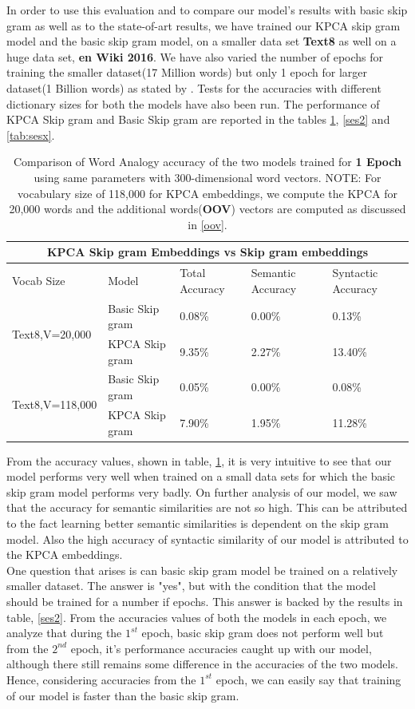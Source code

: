 In order to use this evaluation and to compare our model's results with basic skip gram as well as to the state-of-art results, we have trained our KPCA skip gram model and the basic skip gram model, on a smaller data set \textbf{Text8} as well on a huge data set, \textbf{en Wiki 2016}. We have also varied the number of epochs for training the smaller dataset(17 Million words) but only 1 epoch for larger dataset(1 Billion words) as stated by \cite{mikolov2013efficient}. Tests for the accuracies with different dictionary sizes for both the models have also been run.  
The performance of KPCA Skip gram and Basic Skip gram are reported in the tables \ref{ses1}, \ref{ses2} and \ref{tab:sesx}.  
\begin{table}[H]
	\hskip-1.0cm
	\begin{tabular}[htbp]{|l|l|l|l|l|}	
		\hline		
		\multicolumn{5}{|c|}{\textbf{KPCA Skip gram Embeddings vs Skip gram embeddings}} \\
	\hline
	Vocab Size&Model&Total Accuracy&Semantic Accuracy&Syntactic Accuracy\\ 
	\hline
	\multirow{2}{*}{Text8,V=20,000}
	&Basic Skip gram&0.08\%&0.00\%&0.13\%\\
	&KPCA Skip gram&9.35\%&2.27\%&13.40\%\\
	\hline
	\multirow{2}{*}{Text8,V=118,000}
	&Basic Skip gram&0.05\%&0.00\%&0.08\%\\
	&KPCA Skip gram&7.90\%&1.95\%&11.28\%\\
	\hline
\end{tabular}
\caption{Comparison of Word Analogy accuracy of the two models trained for \textbf{1 Epoch} using same parameters with 300-dimensional word vectors. NOTE: For vocabulary size of 118,000 for KPCA embeddings, we compute the KPCA for 20,000 words and the additional words(\textbf{OOV}) vectors are computed as discussed in \ref{oov}.}\label{ses1}
\end{table} 
From the accuracy values, shown in table, \ref{ses1}, it is very intuitive to see that our model performs very well when trained on a small data sets for which the basic skip gram model performs very badly. On further analysis of our model, we saw that the accuracy for semantic similarities are not so high. This can be attributed to the fact learning better semantic similarities is dependent on the skip gram model. Also the high accuracy of syntactic similarity of our model is attributed to the KPCA embeddings.\\
One question that arises is can basic skip gram model be trained on a relatively smaller dataset. The answer is "yes", but with the condition that the model should be trained for a number if epochs. This answer is backed by the results in table, \ref{ses2}. From the accuracies values of both the models in each epoch, we analyze that during the $1^{st}$ epoch, basic skip gram does not perform well but from the $2^{nd}$ epoch, it's performance accuracies caught up with our model, although there still remains some difference in the accuracies of the two models. Hence, considering accuracies from the $1^{st}$ epoch, we can easily say that training of our model is faster than the basic skip gram. 
